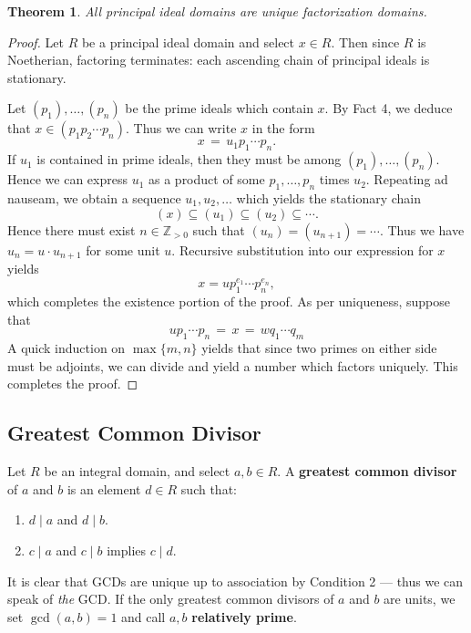 \documentclass[11pt]{article}
\newtheorem{theorem}{Theorem}
\begin{document}
\begin{adjustwidth}{0.5cm}{}
  \begin{theorem}
    All principal ideal domains are unique factorization domains.
  \end{theorem}
  \begin{proof}
    Let $R$ be a principal ideal domain and select $x \in R$. Then since $R$ is Noetherian, factoring terminates: each ascending chain of principal ideals is stationary.

    Let $(p_{1}), \ldots, (p_{n})$ be the prime ideals which contain $x$. By Fact 4, we deduce that $x \in (p_{1}p_{2} \cdots p_{n})$. Thus we can write $x$ in the form
    \[
      x \, = \, u_{1} p_{1} \cdots p_{n}.
    \]
    If $u_{1}$ is contained in prime ideals, then they must be among $(p_{1}), \ldots, (p_{n})$. Hence we can express $u_{1}$ as a product of some $p_{1}, \ldots, p_{n}$ times $u_{2}$. Repeating ad nauseam, we obtain a sequence $u_{1}, u_{2}, \ldots$ which yields the stationary chain
    \[
      (x) \subseteq (u_{1}) \subseteq (u_{2}) \subseteq \cdots.
    \]
    Hence there must exist $n \in \mathbb{Z}_{> 0}$ such that $(u_{n}) = (u_{n + 1}) = \cdots$. Thus we have $u_{n} = u \cdot u_{n + 1}$ for some unit $u$. Recursive substitution into our expression for $x$ yields
    \[
      x = u p_{1}^{e_{1}} \cdots p_{n}^{e_{n}},
    \]
    which completes the existence portion of the proof. As per uniqueness, suppose that
    \[
      u p_{1} \cdots p_{n} \, = \, x \, = \, w q_{1} \cdots q_{m}
    \]
    A quick induction on $\max \{ m, n \}$ yields that since two primes on either side must be adjoints, we can divide and yield a number which factors uniquely. This completes the proof.
  \end{proof}
\end{adjustwidth}


\subsection{Greatest Common Divisor}

Let $R$ be an integral domain, and select $a, b \in R$. A \textbf{greatest common divisor} of $a$ and $b$ is an element $d \in R$ such that:
\begin{enumerate}
  \item $d \mid a$ and $d \mid b$.
  \item $c \mid a$ and $c \mid b$ implies $c \mid d$.
\end{enumerate}
It is clear that GCDs are unique up to association by Condition 2 --- thus we can speak of \textit{the} GCD. If the only greatest common divisors of $a$ and $b$ are units, we set $\gcd(a, b) = 1$ and call $a, b$ \textbf{relatively prime}.
\end{document}
